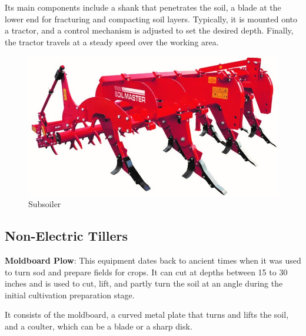 \documentclass{article}
\begin{document}
\begin{flushleft}
Its main components include a shank that penetrates the soil, a blade at the lower end for fracturing and compacting soil layers. Typically, it is mounted onto a tractor, and a control mechanism is adjusted to set the desired depth. Finally, the tractor travels at a steady speed over the working area.
\newline
\FloatBarrier
\begin{center}
    \begin{figure}[htbp]
        \centering
    \includegraphics[scale=0.25]{cultivating_tool/subsoiler.jpg}
    \caption{Subsoiler}
    \end{figure}
\end{center}
\FloatBarrier


\subsection*{Non-Electric Tillers}

\textbf{Moldboard Plow}: This equipment dates back to ancient times when it was used to turn sod and prepare fields for crops. It can cut at depths between 15 to 30 inches and is used to cut, lift, and partly turn the soil at an angle during the initial cultivation preparation stage.
\newline 

It consists of the moldboard, a curved metal plate that turns and lifts the soil, and a coulter, which can be a blade or a sharp disk.\newline


\end{flushleft}
\end{document}

